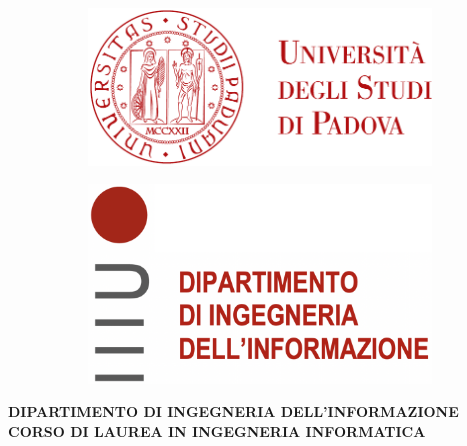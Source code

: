 \begin{titlepage}
        \begin{figure}
            \centering
            \begin{subfigure}[b]{0.4\textwidth}
                \includegraphics[width=\textwidth]{Immagini/logo_unipd}
            \end{subfigure}
            \hfill
            \begin{subfigure}[b]{0.3\textwidth}
                \includegraphics[width=\textwidth]{Immagini/logo_dei.png}
            \end{subfigure}
        \end{figure}
    
    
        \begin{center}
            \makeatletter %

            \textbf{DIPARTIMENTO DI INGEGNERIA DELL'INFORMAZIONE}\\
            \textbf{CORSO DI LAUREA IN INGEGNERIA INFORMATICA}
    

\end{center}
\end{titlepage}
